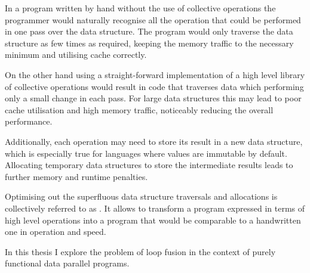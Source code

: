 \documentclass[preamble.tex]{subfiles}
\begin{document}
In a program written by hand without the use of collective operations the programmer would naturally recognise all the operation that could be performed in one pass over the data structure. The program would only traverse the data structure as few times as required, keeping the memory traffic to the necessary minimum and utilising cache correctly.

On the other hand using a straight-forward implementation of a high level library of collective operations would result in code that traverses data which performing only a small change in each pass. For large data structures this may lead to poor cache utilisation and high memory traffic, noticeably reducing the overall performance.

Additionally, each operation may need to store its result in a new data structure, which is especially true for languages where values are immutable by default. Allocating temporary data structures to store the intermediate results leads to further memory and runtime penalties.

Optimising out the superfluous data structure traversals and allocations is collectively referred to as \ifusion{}. It allows to transform a program expressed in terms of high level operations into a program that would be comparable to a handwritten one in operation and speed.

In this thesis I explore the problem of loop fusion in the context of purely functional data parallel programs. %
\end{document}
